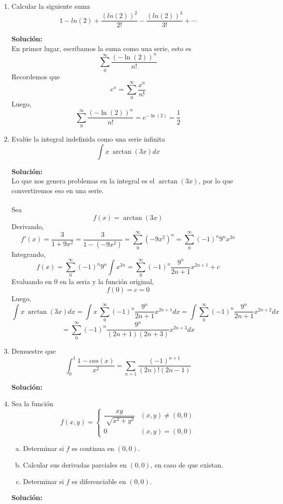 \documentclass[12pt]{article}
\newenvironment{solucion}
{\begin{mdframed}[backgroundcolor=black!10]
		{\bf Solución:}\\
	}
	{
	\end{mdframed}
}
\newenvironment{preguntas}
{\begin{enumerate}\itemsep12pt
	}
	{
	\end{enumerate}
}
\begin{document}
\begin{preguntas}
\item Calcular la siguiente suma
	$$1 - ln(2) + \dfrac{(ln(2))^2}{2!}-\dfrac{(ln(2))^3}{3!}+\cdots$$
\begin{solucion}
En primer lugar, escribamos la suma como una serie, esto es
$$\sum\limits_{0}^{\infty} \dfrac{(-\ln(2))^n}{n!}$$
Recordemos que
$$e^x = \sum\limits_{0}^{\infty} \dfrac{x^n}{n!}$$
Luego,
$$\sum\limits_{0}^{\infty} \dfrac{(-\ln(2))^n}{n!} = e^{-\ln(2)} = \dfrac{1}{2}$$
\end{solucion}
\item Evalúe la integral indefinida como una serie infinita
	$$\int x\ \arctan(3x)dx$$
\begin{solucion}
Lo que nos genera problemas en la integral es el $\arctan(3x)$, por lo que convertiremos eso en una serie.\\
\\
Sea
$$f(x) = \arctan(3x)$$
Derivando,
$$f'(x) = \dfrac{3}{1+9x^2} = \dfrac{3}{1-(-9x^2)} = \sum\limits_0^{\infty}(-9x^2)^n = \sum\limits_0^{\infty}(-1)^n 9^n x^{2n}$$
Integrando,
$$f(x) = \sum\limits_0^{\infty}(-1)^n 9^n \int x^{2n} = \sum\limits_0^{\infty}(-1)^n \dfrac{9^n}{2n+1}x^{2n+1} + c$$
Evaluando en 0 en la seria y la función original,
$$f(0) = c = 0$$
Luego,
$$\int x\ \arctan(3x)dx
= \int x\ \sum\limits_0^{\infty}(-1)^n \dfrac{9^n}{2n+1}x^{2n+1}dx
= \int \sum\limits_0^{\infty}(-1)^n \dfrac{9^n}{2n+1}x^{2n+2}dx
$$
$$
= \sum\limits_0^{\infty}(-1)^n \dfrac{9^n}{(2n+1)(2n+3)}x^{2n+3}dx
$$
\end{solucion}
\item Demuestre que
$$\int_0^1 \dfrac{1-cos(x)}{x^2} = \sum\limits_{n=1} \dfrac{(-1)^{n+1}}{(2n)!(2n-1)} $$
\begin{solucion}

\end{solucion}
\item Sea la función
	$$f(x,y)=
	\begin{cases}
	\dfrac{xy}{\sqrt[]{x^2+y^2}} & (x,y) \neq (0,0)\\
	0 & (x,y)=(0,0)
	\end{cases}
	$$
\begin{enumerate}[a)]
\item Determinar si $f$ es continua en $(0,0)$.
\item Calcular sus derivadas parciales en $(0,0)$, en caso de que existan.
\item Determinar si $f$ es diferenciable en $(0,0)$.
\end{enumerate}
\begin{solucion}


\end{solucion}
\end{preguntas}
\end{document}
